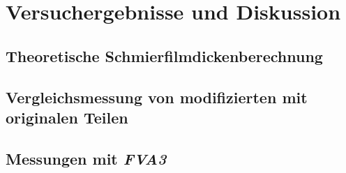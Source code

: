 \chapter{Versuchergebnisse und Diskussion}
\label{chap:ergebnisse_und_diskussion}

\section{Theoretische Schmierfilmdickenberechnung}
\label{sec:theoretische_schmierfilmdickenberechnung}

\section{Vergleichsmessung von modifizierten mit originalen Teilen}
\label{sec:vergleichsmessung}

\section{Messungen mit \textit{FVA3}}
\label{sec:messungen_mit_fva3}

